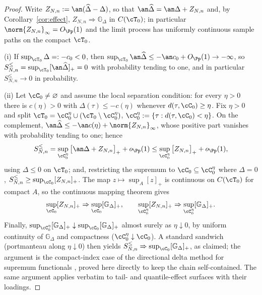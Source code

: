 \closuredraft
\begin{proof}
Write $Z_{N,n}:=\an(\widehat\Delta-\Delta)$, so that
$\an\widehat\Delta=\an\Delta+Z_{N,n}$ and, by
Corollary~\ref{cor:effect}, $Z_{N,n}\Rightarrow\mathbb G_\Delta$ in
$C(\cT_0)$; in particular $\norm{Z_{N,n}}_\infty=O_{\Pp}(1)$ and the limit
process has uniformly continuous sample paths on the compact $\cT_0$.

(i) If $\sup_{\cT_0}\Delta=:-c_0<0$, then
$\sup_{\cT_0}\an\widehat\Delta\le-\an c_0+O_{\Pp}(1)\to-\infty$, so
$S^{\le}_{N,n}=\sup_{\cT_0}[\an\widehat\Delta]_+=0$ with probability tending
to one, and in particular $S^{\le}_{N,n}\to0$ in probability.

(ii) Let $\cC_0\ne\varnothing$ and assume the local separation condition:
for every $\eta>0$ there is $c(\eta)>0$ with
$\Delta(\tau)\le-c(\eta)$ whenever $d(\tau,\cC_0)\ge\eta$. Fix $\eta>0$ and
split $\cT_0=\cC_0^\eta\cup(\cT_0\setminus\cC_0^\eta)$,
$\cC_0^\eta:=\{\tau:d(\tau,\cC_0)<\eta\}$.
On the complement, $\an\widehat\Delta\le-\an c(\eta)+\norm{Z_{N,n}}_\infty$,
whose positive part vanishes with probability tending to one; hence
\[
 S^{\le}_{N,n}
 =\sup_{\cC_0^\eta}\big[\an\Delta+Z_{N,n}\big]_+
 +o_{\Pp}(1)
 \le\sup_{\cC_0^\eta}\big[Z_{N,n}\big]_+ +o_{\Pp}(1),
\]
using $\Delta\le0$ on $\cT_0$; and, restricting the supremum to
$\cC_0\subseteq\cC_0^\eta$ where $\Delta=0$,
$S^{\le}_{N,n}\ge\sup_{\cC_0}[Z_{N,n}]_+$.
The map $z\mapsto\sup_{A}[z]_+$ is continuous on $C(\cT_0)$ for compact
$A$, so the continuous mapping theorem gives
\[
 \sup_{\cC_0}[Z_{N,n}]_+\Rightarrow\sup_{\cC_0}[\mathbb G_\Delta]_+,
 \qquad
 \sup_{\cC_0^\eta}[Z_{N,n}]_+\Rightarrow\sup_{\cC_0^\eta}[\mathbb G_\Delta]_+ .
\]
Finally, $\sup_{\cC_0^\eta}[\mathbb G_\Delta]_+
\downarrow\sup_{\cC_0}[\mathbb G_\Delta]_+$ almost surely as
$\eta\downarrow0$, by uniform continuity of $\mathbb G_\Delta$ and
compactness ($\cC_0^\eta\downarrow\cC_0$). A standard sandwich
(portmanteau along $\eta\downarrow0$) then yields
$S^{\le}_{N,n}\Rightarrow\sup_{\cC_0}[\mathbb G_\Delta]_+$, as claimed;
the argument is the compact-index case of the directional delta method for
supremum functionals \citep[cf.][]{Carcamo2020,FangSantos2019}, proved here
directly to keep the chain self-contained. The
same argument applies verbatim to tail- and quantile-effect surfaces with
their loadings.
\end{proof}
